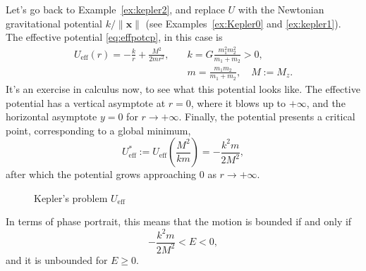 \documentclass[english,fontsize=11pt,paper=a5,oneside]{scrbook}
\newcommand{\bx}{\bm{x}}
\theoremstyle{definition}
\begin{document}
Let's go back to Example~\ref{ex:kepler2}, and replace $U$ with the Newtonian gravitational potential $k/\|\bx\|$ (see Examples~\ref{ex:Kepler0} and \ref{ex:kepler1}).
The effective potential \eqref{eq:effpotcp}, in this case is
\begin{align}
    U_{\mathrm{eff}} (r) = -\frac kr + \frac {M^2}{2 m r^2}, \quad &k = G \frac{m_1^2 m_2^2}{m_1+m_2} > 0,\\
    &m = \frac{m_1m_2}{m_1+m_2}, \quad M := M_z.
\end{align}
It's an exercise in calculus now, to see what this potential looks like.
The effective potential has a vertical asymptote at $r=0$, where it blows up to $+\infty$,
and the horizontal asymptote $y=0$ for $r\to+\infty$.
Finally, the potential presents a critical point, corresponding to a global minimum,
\begin{equation}
    U_{\mathrm{eff}}^* := U_{\mathrm{eff}}\left(\frac{M^2}{k m}\right) = - \frac{k^2m}{2M^2},
\end{equation}
after which the potential grows approaching $0$ as $r\to+\infty$.

\begin{figure}[th]
    \centering
    \label{fig:KeplerVeff}
    \caption{Kepler's problem $U_{\mathrm{eff}}$}
\end{figure}
In terms of phase portrait, this means that the motion is bounded if and only if
\begin{equation}
    - \frac{k^2 m}{2 M^2} < E < 0,
\end{equation}
and it is unbounded for $E \geq 0$.
\end{document}
